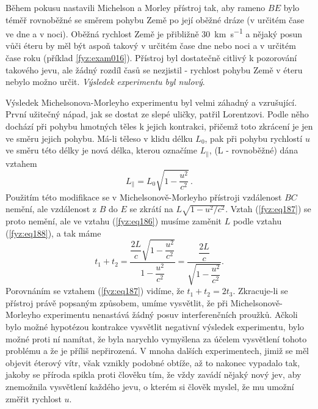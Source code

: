     Během pokusu nastavili Michelson a Morley přístroj tak, aby rameno \(BE\) bylo téměř rovnoběžné
    se směrem pohybu Země po její oběžné dráze (v určitém čase ve dne a v noci). Oběžná rychlost
    Země je přibližně \SI{30}{\km\per\s} a nějaký posun vůči éteru by měl být aspoň takový v určitém
    čase dne nebo noci a v určitém čase roku (příklad \ref{fyz:exam016}). Přístroj byl
    dostatečně citlivý k pozorování takového jevu, ale žádný rozdíl časů se nezjistil - rychlost
    pohybu Země v éteru nebylo možno určit. \emph{Výsledek experimentu byl nulový}.
    
    Výsledek Michelsonova-Morleyho experimentu byl velmi záhadný a vzrušující. První užitečný 
    nápad, jak se dostat ze slepé uličky, patřil Lorentzovi. Podle něho dochází při pohybu hmotných 
    těles k jejich kontrakci, přičemž toto zkrácení je jen ve směru jejich pohybu. Má-li těleso v 
    klidu délku \(L_0\), pak při pohybu rychlostí \(u\) ve směru této délky je nová délka, kterou 
    označíme \(L_\parallel\), (L - rovnoběžné) dána vztahem
    \begin{equation}\label{fyz:eq188}
      \boxed{L_\parallel = L_0\sqrt{1 - \frac{u^2}{c^2}}}\,.
    \end{equation}
    Použitím této modifikace se v Michelsonově-Morleyho přístroji vzdálenost \(BC\) nemění, ale 
    vzdálenost z \(B\) do \(E\) se zkrátí na \(L\sqrt{1 - u^2/c^2}\). Vztah (\ref{fyz:eq187}) se 
    proto nemění, ale ve vztahu (\ref{fyz:eq186}) musíme zaměnit \(L\) podle vztahu 
    (\ref{fyz:eq188}), a tak máme 
    \begin{equation}\label{fyz:eq189}
      t_1 + t_2 = \frac{\dfrac{2L}{c}\sqrt{1- \dfrac{u^2}{c^2}}}{1- \dfrac{u^2}{c^2}}
                = \frac{\dfrac{2L}{c}}{\sqrt{1- \dfrac{u^2}{c^2}}}.
    \end{equation}
    Porovnáním se vztahem (\ref{fyz:eq187}) vidíme, že \(t_1 + t_2 = 2t_3\). Zkracuje-li se 
    přístroj právě popsaným způsobem, umíme vysvětlit, že při Michelsonově-Morleyho experimentu 
    nenastává žádný posuv interferenčních proužků. Ačkoli bylo možné hypotézou kontrakce vysvětlit 
    negativní výsledek experimentu, bylo možné proti ní namítat, že byla narychlo vymyšlena za 
    účelem vysvětlení tohoto problému a že je příliš nepřirozená. V mnoha dalších experimentech, 
    jimiž se měl objevit éterový vítr, však vznikly podobné obtíže, až to nakonec vypadalo tak, 
    jakoby se příroda spikla proti člověku tím, že vždy zavádí nějaký nový jev, aby znemožnila 
    vysvětlení každého jevu, o kterém si člověk myslel, že mu umožní změřit rychlost \(u\).
    
